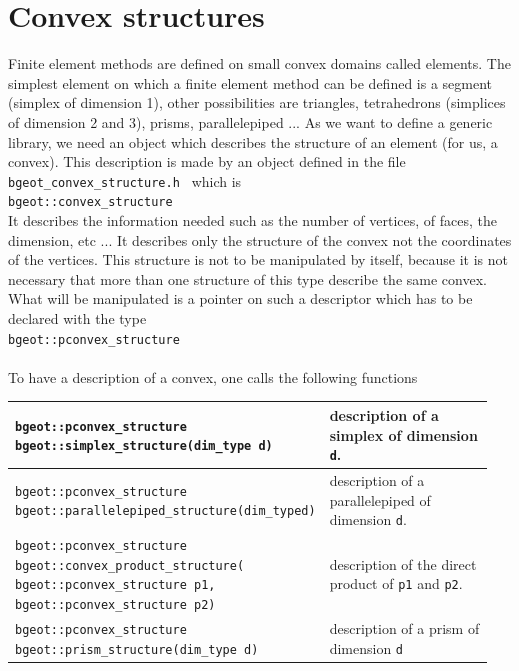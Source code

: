 \documentclass[11pt,a4paper]{article}
\begin{document}
\newpage
\tableofcontents
\newpage


\section{Convex structures}
Finite element methods are defined on small convex domains called elements. The simplest element on which a finite element method can be defined is a segment (simplex of dimension 1), other possibilities are triangles, tetrahedrons (simplices of dimension 2 and 3), prisms, parallelepiped ...
As we want to define a generic library, we need an object which describes the structure of an element (for us, a convex). This description is made by an object defined in the file {\tt bgeot\_convex\_structure.h } which is\\[0.5cm]
{\tt bgeot::convex\_structure }\\[0.5cm]
It describes the information needed such as the number of vertices, of faces, the dimension, etc ... It describes only the structure of the convex not the coordinates of the vertices.
This structure is not to be manipulated by itself, because it is not necessary that more than one structure of this type describe the same convex. What will be manipulated is a pointer on such a  descriptor which has to be declared with the type\\[0.5cm]
{ \tt bgeot::pconvex\_structure } \\ \\

To have a description of a convex, one calls the following functions

\begin{center} \begin{tabular}{|m{0.55\linewidth}|m{0.4\linewidth}|} \hline
  {\tt bgeot::pconvex\_structure bgeot::simplex\_structure(dim\_type d)} & description of a simplex of dimension {\tt d}. \\ \hline
  {\tt bgeot::pconvex\_structure bgeot::parallelepiped\_structure(dim\_type\;d)} &  description of a parallelepiped of dimension {\tt d}. \\ \hline
  {\tt bgeot::pconvex\_structure bgeot::convex\_product\_structure( bgeot::pconvex\_structure p1, bgeot::pconvex\_structure p2) } & description of the direct product of {\tt p1} and {\tt p2}.\\ \hline
  {\tt bgeot::pconvex\_structure bgeot::prism\_structure(dim\_type d)}  & description of a prism of dimension {\tt d}\\ \hline
\end{tabular} \end{center}
\end{document}
